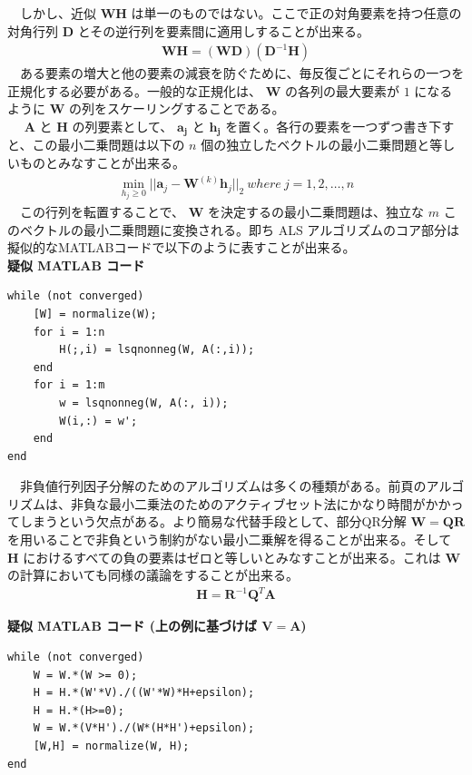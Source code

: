 \documentclass[a4paper,10pt]{jarticle}
\begin{document}
　しかし、近似 \(\bm{W}\bm{H}\) は単一のものではない。ここで正の対角要素を持つ任意の対角行列 \(\bm{D}\) とその逆行列を要素間に適用しすることが出来る。\\
\begin{align*}
\bm{W}\bm{H} = (\bm{W}\bm{D})(\bm{D}^{-1}\bm{H})
\end{align*}
　ある要素の増大と他の要素の減衰を防ぐために、毎反復ごとにそれらの一つを正規化する必要がある。一般的な正規化は、 \(\bm{W}\) の各列の最大要素が \(1\) になるように \(\bm{W}\) の列をスケーリングすることである。\\
　 \(\bm{A}\) と \(\bm{H}\) の列要素として、 \(\bm{a_j}\) と \(\bm{h_j}\) を置く。各行の要素を一つずつ書き下すと、この最小二乗問題は以下の \(n\) 個の独立したベクトルの最小二乗問題と等しいものとみなすことが出来る。\\
\begin{align*}
\min_{h_j\geq 0}||\bm{a}_j - \bm{W}^{(k)}\bm{h}_j||_2 \ where\ j= 1,2,\dots , n
\end{align*}
　この行列を転置することで、 \(\bm{W}\) を決定するの最小二乗問題は、独立な \(m\) このベクトルの最小二乗問題に変換される。即ち ALS アルゴリズムのコア部分は擬似的なMATLABコードで以下のように表すことが出来る。\\

\textbf{疑似 MATLAB コード}\\
\begin{verbatim}
while (not converged)
    [W] = normalize(W);
    for i = 1:n
        H(;,i) = lsqnonneg(W, A(:,i));
    end
    for i = 1:m
        w = lsqnonneg(W, A(:, i));
        W(i,:) = w';
    end
end
\end{verbatim}

　非負値行列因子分解のためのアルゴリズムは多くの種類がある。前頁のアルゴリズムは、非負な最小二乗法のためのアクティブセット法にかなり時間がかかってしまうという欠点がある。より簡易な代替手段として、部分QR分解 \(\bm{W}=\bm{Q}\bm{R}\) を用いることで非負という制約がない最小二乗解を得ることが出来る。そして \(\bm{H}\) におけるすべての負の要素はゼロと等しいとみなすことが出来る。これは \(\bm{W}\) の計算においても同様の議論をすることが出来る。\\
\begin{align*}
\bm{H} = \bm{R}^{-1}\bm{Q}^T\bm{A}
\end{align*}

\textbf{疑似 MATLAB コード (上の例に基づけば \(\bm{V} = \bm{A}\))}\\
\begin{verbatim}
while (not converged)
    W = W.*(W >= 0);
    H = H.*(W'*V)./((W'*W)*H+epsilon);
    H = H.*(H>=0);
    W = W.*(V*H')./(W*(H*H')+epsilon);
    [W,H] = normalize(W, H);
end
\end{verbatim}
\end{document}
